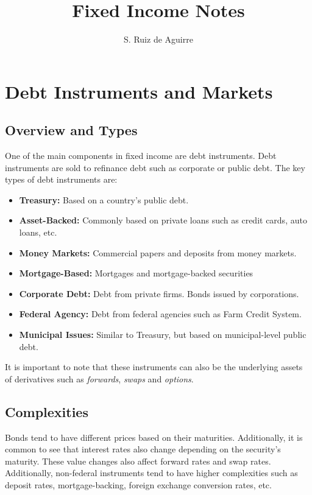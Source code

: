\documentclass[10pt,letterpaper]{article}
\title{Fixed Income Notes}
\author{S. Ruiz de Aguirre}
\begin{document}
\maketitle
{\hypersetup{hidelinks} \tableofcontents}
\newpage
\section{Debt Instruments and Markets}
\subsection{Overview and Types}
One of the main components in fixed income are debt instruments. Debt instruments are sold to refinance debt such as corporate or public debt. The key types of debt instruments are:
\begin{itemize}
\item \textbf{Treasury:} Based on a country's public debt.
\item \textbf{Asset-Backed:} Commonly based on private loans such as credit cards, auto loans, etc.
\item \textbf{Money Markets:} Commercial papers and deposits from money markets.
\item \textbf{Mortgage-Based:} Mortgages and mortgage-backed securities
\item \textbf{Corporate Debt:} Debt from private firms. Bonds issued by corporations.
\item \textbf{Federal Agency:} Debt from federal agencies such as Farm Credit System.
\item \textbf{Municipal Issues:} Similar to Treasury, but based on municipal-level public debt.
\end{itemize}

It is important to note that these instruments can also be the underlying assets of derivatives such as \emph{forwards}, \emph{swaps} and \emph{options}.

\subsection{Complexities}
Bonds tend to have different prices based on their maturities. Additionally, it is common to see that interest rates also change depending on the security's maturity. These value changes also affect forward rates and swap rates. Additionally, non-federal instruments tend to have higher complexities such as deposit rates, mortgage-backing, foreign exchange conversion rates, etc.
\end{document}
